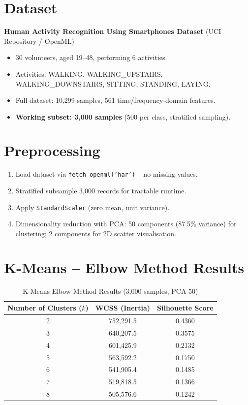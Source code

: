 \documentclass[11pt]{article}
\begin{document}
\section*{Dataset}
\textbf{Human Activity Recognition Using Smartphones Dataset} (UCI Repository / OpenML)
\begin{itemize}
    \item 30 volunteers, aged 19--48, performing 6 activities.
    \item Activities: WALKING, WALKING\_UPSTAIRS, WALKING\_DOWNSTAIRS, SITTING, STANDING, LAYING.
    \item Full dataset: 10,299 samples, 561 time/frequency-domain features.
    \item \textbf{Working subset: 3,000 samples} (500 per class, stratified sampling).
\end{itemize}

\section*{Preprocessing}
\begin{enumerate}
    \item Load dataset via \texttt{fetch\_openml('har')} -- no missing values.
    \item Stratified subsample 3,000 records for tractable runtime.
    \item Apply \texttt{StandardScaler} (zero mean, unit variance).
    \item Dimensionality reduction with PCA: 50 components (87.5\% variance) for clustering; 2 components for 2D scatter visualisation.
\end{enumerate}

\section*{K-Means -- Elbow Method Results}

\begin{table}[H]
\centering
\caption{K-Means Elbow Method Results (3,000 samples, PCA-50)}
\renewcommand{\arraystretch}{1.3}
\begin{tabular}{|c|c|c|}
\hline
\textbf{Number of Clusters ($k$)} & \textbf{WCSS (Inertia)} & \textbf{Silhouette Score} \\
\hline
2 & 752,291.5 & 0.4360 \\
3 & 640,207.5 & 0.3575 \\
4 & 601,425.9 & 0.2132 \\
5 & 563,592.2 & 0.1750 \\
6 & 541,905.4 & 0.1485 \\
7 & 519,818.5 & 0.1366 \\
8 & 505,576.6 & 0.1242 \\
\hline
\end{tabular}
\end{table}
\end{document}
